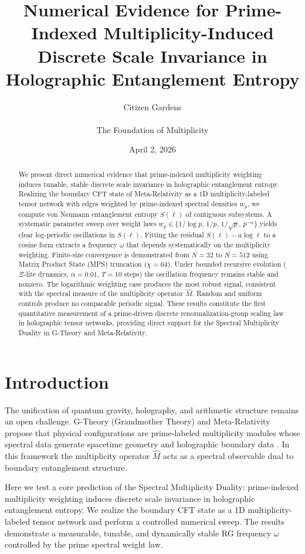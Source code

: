 \documentclass[11pt, a4paper]{article}
\title{Numerical Evidence for Prime-Indexed Multiplicity-Induced Discrete Scale Invariance in Holographic Entanglement Entropy}
\author{Citizen Gardens \\ \\
The Foundation of Multiplicity}
\date{April 2, 2026}
\begin{document}
\maketitle

\begin{abstract}
We present direct numerical evidence that prime-indexed multiplicity weighting induces tunable, stable discrete scale invariance in holographic entanglement entropy. Realizing the boundary CFT state of Meta-Relativity as a 1D multiplicity-labeled tensor network with edges weighted by prime-indexed spectral densities \(w_p\), we compute von Neumann entanglement entropy \(S(\ell)\) of contiguous subsystems. A systematic parameter sweep over weight laws \(w_p \in \{1/\log p,\, 1/p,\, 1/\sqrt{p},\, p^{-\alpha}\}\) yields clear log-periodic oscillations in \(S(\ell)\). Fitting the residual \(S(\ell) - a \log \ell\) to a cosine form extracts a frequency \(\omega\) that depends systematically on the multiplicity weighting. Finite-size convergence is demonstrated from \(N=32\) to \(N=512\) using Matrix Product State (MPS) truncation (\(\chi=64\)). Under bounded recursive evolution (\(\Xi\)-lite dynamics, \(\alpha=0.01\), \(T=10\) steps) the oscillation frequency remains stable and nonzero. The logarithmic weighting case produces the most robust signal, consistent with the spectral measure of the multiplicity operator \(\hat{M}\). Random and uniform controls produce no comparable periodic signal. These results constitute the first quantitative measurement of a prime-driven discrete renormalization-group scaling law in holographic tensor networks, providing direct support for the Spectral Multiplicity Duality in G-Theory and Meta-Relativity.
\end{abstract}

\section{Introduction}
The unification of quantum gravity, holography, and arithmetic structure remains an open challenge. G-Theory (Grandmother Theory) and Meta-Relativity propose that physical configurations are prime-labeled multiplicity modules whose spectral data generate spacetime geometry and holographic boundary data \citep{vanGelder2026gtheory, vanGelder2026metarel}. In this framework the multiplicity operator \(\hat{M}\) acts as a spectral observable dual to boundary entanglement structure.

Here we test a core prediction of the Spectral Multiplicity Duality: prime-indexed multiplicity weighting induces discrete scale invariance in holographic entanglement entropy. We realize the boundary CFT state as a 1D multiplicity-labeled tensor network and perform a controlled numerical sweep. The results demonstrate a measurable, tunable, and dynamically stable RG frequency \(\omega\) controlled by the prime spectral weight law.
\end{document}
